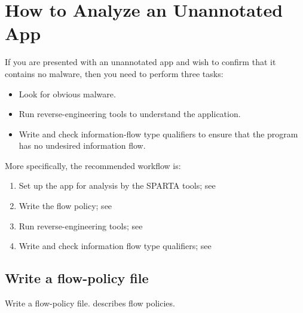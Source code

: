 \htmlhr
\chapter{How to Analyze an Unannotated App\label{analyze-unannotated-app}}

If you are presented with an unannotated app and wish to confirm that it
contains no malware, then you need to perform three tasks:
\begin{itemize}
\item
  Look for obvious malware.
\item
  Run reverse-engineering tools to understand the application.
\item
  Write and check information-flow type qualifiers to ensure that the
  program has no undesired information flow.
\end{itemize}


More specifically, the recommended workflow is:

\begin{enumerate}
\item Set up the app for analysis by the SPARTA tools; see 
\item Write the flow policy; see 
\item Run reverse-engineering tools; see 
\item Write and check information flow type qualifiers; see 
\end{enumerate}

% 
% 




\section{Write a flow-policy file\label{sec:write-flow-policy}}

Write a flow-policy file.   describes flow policies.

